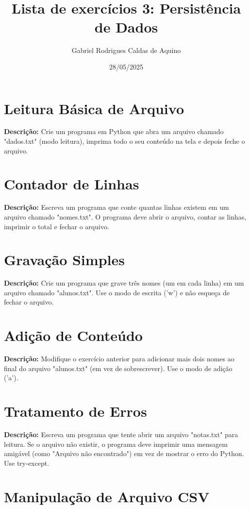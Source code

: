 \title{Lista de exercícios 3: Persistência de Dados}
\author{Gabriel Rodrigues Caldas de Aquino}
\date{28/05/2025}



\maketitle
    
\section{Leitura Básica de Arquivo}
    \textbf{Descrição:} Crie um programa em Python que abra um arquivo chamado "dados.txt" (modo leitura), imprima todo o seu conteúdo na tela e depois feche o arquivo.

\section{Contador de Linhas}
        \textbf{Descrição:} Escreva um programa que conte quantas linhas existem em um arquivo chamado "nomes.txt". O programa deve abrir o arquivo, contar as linhas, imprimir o total e fechar o arquivo.

\section{Gravação Simples}
        \textbf{Descrição:} Crie um programa que grave três nomes (um em cada linha) em um arquivo chamado "alunos.txt". Use o modo de escrita ('w') e não esqueça de fechar o arquivo.

\section{Adição de Conteúdo}
        \textbf{Descrição:} Modifique o exercício anterior para adicionar mais dois nomes ao final do arquivo "alunos.txt" (em vez de sobrescrever). Use o modo de adição ('a').

\section{Tratamento de Erros}
        \textbf{Descrição:} Escreva um programa que tente abrir um arquivo "notas.txt" para leitura. Se o arquivo não existir, o programa deve imprimir uma mensagem amigável (como "Arquivo não encontrado") em vez de mostrar o erro do Python. Use try-except.   

\section{Manipulação de Arquivo CSV}

